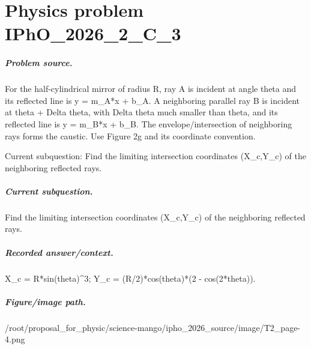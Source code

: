 
\chapter{Physics problem IPhO\_2026\_2\_C\_3}
\label{ch:IPhO2026Problems_problem_IPhO_2026_2_C_3}

\paragraph{Problem source.}
For the half-cylindrical mirror of radius R, ray A is incident at angle theta
and its reflected line is y = m\_A*x + b\_A.  A neighboring parallel ray B is
incident at theta + Delta theta, with Delta theta much smaller than theta, and
its reflected line is y = m\_B*x + b\_B.  The envelope/intersection of neighboring
rays forms the caustic.  Use Figure 2g and its coordinate convention.

Current subquestion:
Find the limiting intersection coordinates (X\_c,Y\_c) of the neighboring reflected rays.

\paragraph{Current subquestion.}
Find the limiting intersection coordinates (X\_c,Y\_c) of the neighboring reflected rays.

\paragraph{Recorded answer/context.}
X\_c = R*sin(theta)\textasciicircum{}3; Y\_c = (R/2)*cos(theta)*(2 - cos(2*theta)).

\paragraph{Figure/image path.}
/root/proposal\_for\_physic/science-mango/ipho\_2026\_source/image/T2\_page-4.png

